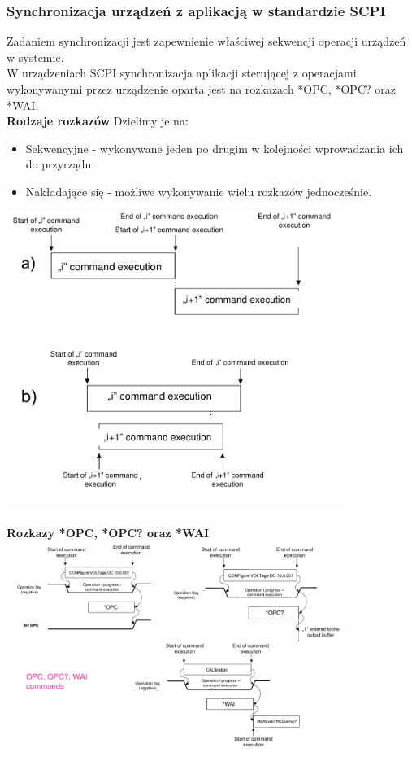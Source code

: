 \subsubsection{Synchronizacja urządzeń z aplikacją w standardzie SCPI}
Zadaniem synchronizacji jest zapewnienie właściwej sekwencji operacji urządzeń w systemie.\\
W urządzeniach SCPI synchronizacja aplikacji sterującej z operacjami wykonywanymi przez urządzenie oparta jest na rozkazach *OPC, *OPC? oraz *WAI.\\
\textbf{Rodzaje rozkazów}
Dzielimy je na:
\begin{itemize}
	\item Sekwencyjne - wykonywane jeden po drugim w kolejności wprowadzania ich do przyrządu.
	\item Nakładające się - możliwe wykonywanie wielu rozkazów jednocześnie.
\end{itemize}
\includegraphics[width=11cm]{./wyklady/IEEE488_SCPI_37_1.pdf}\\\\
\textbf{Rozkazy *OPC, *OPC? oraz *WAI}\\
\includegraphics[width=11cm]{./wyklady/IEEE488_SCPI_38_1.pdf}
\newpage
